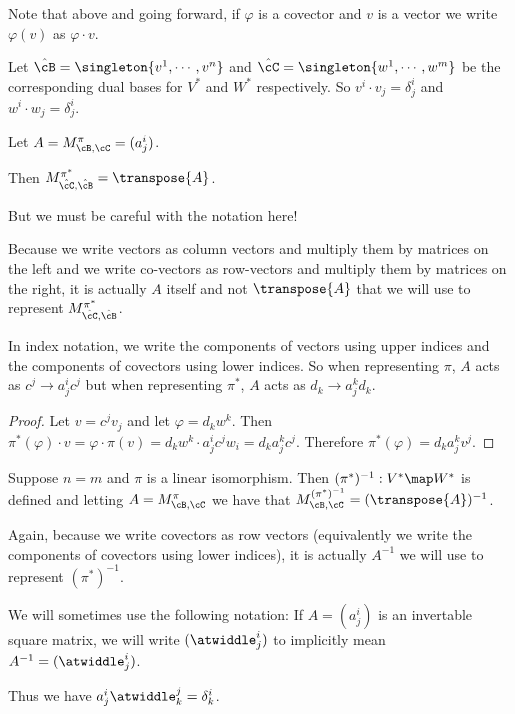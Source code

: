 \documentclass[oneside,12pt]{amsart}
\begin{document}
Note that above and going forward, if
$\varphi$ is a covector and $v$ is a vector we write $\varphi(v)$
as $\varphi \cdot v$.

Let
$\hat{\cB} = \singleton{v^1,\cdots,v^n}$ and
$\hat{\cC} = \singleton{w^1,\cdots,w^m}$ be the corresponding
dual bases for $V^*$ and $W^*$ respectively. 
So $v^i \cdot v_j = \delta^i_j$ and $w^i \cdot w_j = \delta^i_j$.

\begin{lemma}
Let $A = M^{\pi}_{\cB,\cC} =(a^i_j)$.

Then $M^{\pi^*}_{\hat{\cC},\hat{\cB}}  = \transpose{A}$.

But we must be careful with the notation here!

Because we write vectors as column vectors and multiply them by matrices on the left
and we write co-vectors as row-vectors and multiply them by matrices on the right, it
is actually $A$ itself and not $\transpose{A}$ that we will use to represent
$M^{\pi^*}_{\hat{\cC},\hat{\cB}}$.


In index notation, we write the components of vectors using upper indices and the components
of covectors using lower indices. So when representing $\pi$, $A$ acts as
$c^j \to a^i_jc^j$ but when representing $\pi^*$, $A$ acts as $d_k \to a^k_j d_k$.
\end{lemma}
\begin{proof}
Let $v=c^j v_j$ and let $\varphi = d_k w^k$. Then $\pi^*(\varphi)\cdot v = \varphi \cdot \pi(v)
= d_k w^k \cdot a^i_j c^j w_i = d_k a^k_j c ^ j$. Therefore $\pi^*(\varphi) = d_k a^k_j v^j$.
\end{proof}


\begin{corollary}
Suppose $n=m$ and $\pi$ is a linear isomorphism. Then
$(\pi^*)^{-1}:V^* \map W^*$ is defined
and letting $A = M^{\pi}_{\cB,\cC}$ we have that
$M^{(\pi^*)^{-1}}_{\cB,\cC} = (\transpose{A})^{-1}$.

Again, because we write covectors as row vectors (equivalently we write the components of covectors using lower indices), it is actually $A^{-1}$ we will use to represent $(\pi^*)^{-1}.$

\end{corollary}

We will sometimes use the following notation:
If $A =(a^i_j)$ is an invertable square matrix, we will write $(\atwiddle^i_j)$ to implicitly
mean $A^{-1} = (\atwiddle^i_j)$.

Thus we have $a^i_j \atwiddle^j_k = \delta^i_k$.
\end{document}
